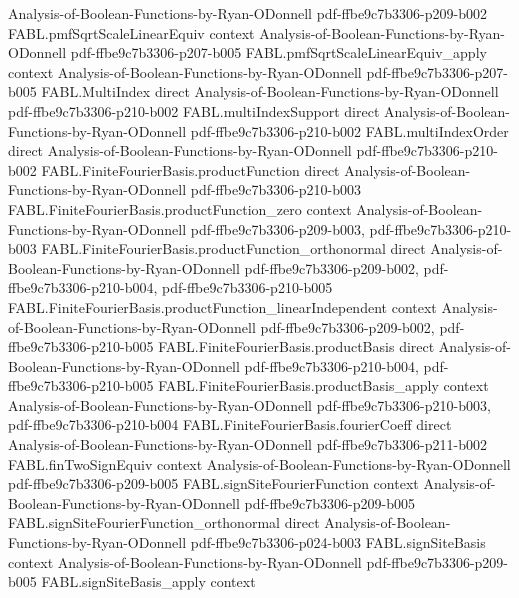 \begin{theorem}
  {Analysis-of-Boolean-Functions-by-Ryan-ODonnell}
  {pdf-ffbe9c7b3306-p209-b002}
\proofstep
  {FABL.pmfSqrtScaleLinearEquiv}
  {context}
  {Analysis-of-Boolean-Functions-by-Ryan-ODonnell}
  {pdf-ffbe9c7b3306-p207-b005}
\proofstep
  {FABL.pmfSqrtScaleLinearEquiv_apply}
  {context}
  {Analysis-of-Boolean-Functions-by-Ryan-ODonnell}
  {pdf-ffbe9c7b3306-p207-b005}
\proofstep
  {FABL.MultiIndex}
  {direct}
  {Analysis-of-Boolean-Functions-by-Ryan-ODonnell}
  {pdf-ffbe9c7b3306-p210-b002}
\proofstep
  {FABL.multiIndexSupport}
  {direct}
  {Analysis-of-Boolean-Functions-by-Ryan-ODonnell}
  {pdf-ffbe9c7b3306-p210-b002}
\proofstep
  {FABL.multiIndexOrder}
  {direct}
  {Analysis-of-Boolean-Functions-by-Ryan-ODonnell}
  {pdf-ffbe9c7b3306-p210-b002}
\proofstep
  {FABL.FiniteFourierBasis.productFunction}
  {direct}
  {Analysis-of-Boolean-Functions-by-Ryan-ODonnell}
  {pdf-ffbe9c7b3306-p210-b003}
\proofstep
  {FABL.FiniteFourierBasis.productFunction_zero}
  {context}
  {Analysis-of-Boolean-Functions-by-Ryan-ODonnell}
  {pdf-ffbe9c7b3306-p209-b003,
    pdf-ffbe9c7b3306-p210-b003}
\proofstep
  {FABL.FiniteFourierBasis.productFunction_orthonormal}
  {direct}
  {Analysis-of-Boolean-Functions-by-Ryan-ODonnell}
  {pdf-ffbe9c7b3306-p209-b002,
    pdf-ffbe9c7b3306-p210-b004,
    pdf-ffbe9c7b3306-p210-b005}
\proofstep
  {FABL.FiniteFourierBasis.productFunction_linearIndependent}
  {context}
  {Analysis-of-Boolean-Functions-by-Ryan-ODonnell}
  {pdf-ffbe9c7b3306-p209-b002,
    pdf-ffbe9c7b3306-p210-b005}
\proofstep
  {FABL.FiniteFourierBasis.productBasis}
  {direct}
  {Analysis-of-Boolean-Functions-by-Ryan-ODonnell}
  {pdf-ffbe9c7b3306-p210-b004,
    pdf-ffbe9c7b3306-p210-b005}
\proofstep
  {FABL.FiniteFourierBasis.productBasis_apply}
  {context}
  {Analysis-of-Boolean-Functions-by-Ryan-ODonnell}
  {pdf-ffbe9c7b3306-p210-b003,
    pdf-ffbe9c7b3306-p210-b004}
\proofstep
  {FABL.FiniteFourierBasis.fourierCoeff}
  {direct}
  {Analysis-of-Boolean-Functions-by-Ryan-ODonnell}
  {pdf-ffbe9c7b3306-p211-b002}
\proofstep
  {FABL.finTwoSignEquiv}
  {context}
  {Analysis-of-Boolean-Functions-by-Ryan-ODonnell}
  {pdf-ffbe9c7b3306-p209-b005}
\proofstep
  {FABL.signSiteFourierFunction}
  {context}
  {Analysis-of-Boolean-Functions-by-Ryan-ODonnell}
  {pdf-ffbe9c7b3306-p209-b005}
\proofstep
  {FABL.signSiteFourierFunction_orthonormal}
  {direct}
  {Analysis-of-Boolean-Functions-by-Ryan-ODonnell}
  {pdf-ffbe9c7b3306-p024-b003}
\proofstep
  {FABL.signSiteBasis}
  {context}
  {Analysis-of-Boolean-Functions-by-Ryan-ODonnell}
  {pdf-ffbe9c7b3306-p209-b005}
\proofstep
  {FABL.signSiteBasis_apply}
  {context}

\end{theorem}
